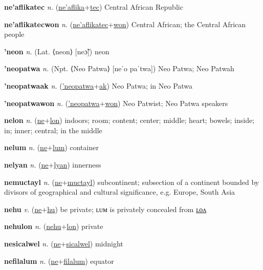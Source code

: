 \textbf{\hypertarget{ne'aflikatec}{ne'aflikatec}} \textit{n.} (\hyperlink{ne'aflika}{ne'aflika}+\allowbreak \hyperlink{tec}{tec})
Central African Republic

\textbf{\hypertarget{ne'aflikatecwon}{ne'aflikatecwon}} \textit{n.} (\hyperlink{ne'aflikatec}{ne'aflikatec}+\allowbreak \hyperlink{won}{won})
Central African; the Central African people

\textbf{\hypertarget{'neon}{'neon}} \textit{n.} (Lat. ⟨neon⟩ [neɔ̃])
neon

\textbf{\hypertarget{'neopatwa}{'neopatwa}} \textit{n.} (Npt. ⟨Neo Patwa⟩ [neˈo paˈtwa])
Neo Patwa; Neo Patwah

\textbf{\hypertarget{'neopatwaak}{'neopatwaak}} \textit{n.} (\hyperlink{'neopatwa}{'neopatwa}+\allowbreak \hyperlink{ak}{ak})
Neo Patwa; in Neo Patwa

\textbf{\hypertarget{'neopatwawon}{'neopatwawon}} \textit{n.} (\hyperlink{'neopatwa}{'neopatwa}+\allowbreak \hyperlink{won}{won})
Neo Patwist; Neo Patwa speakers

\textbf{\hypertarget{nelon}{nelon}} \textit{n.} (\hyperlink{ne}{ne}+\allowbreak \hyperlink{lon}{lon})
indoors; room; content; center; middle; heart; bowels; inside; in; inner; central; in the middle

\textbf{\hypertarget{nelum}{nelum}} \textit{n.} (\hyperlink{ne}{ne}+\allowbreak \hyperlink{lum}{lum})
container

\textbf{\hypertarget{nelyan}{nelyan}} \textit{n.} (\hyperlink{ne}{ne}+\allowbreak \hyperlink{lyan}{lyan})
innerness

\textbf{\hypertarget{nemuctayl}{nemuctayl}} \textit{n.} (\hyperlink{ne}{ne}+\allowbreak \hyperlink{muctayl}{muctayl})
subcontinent; subsection of a continent bounded by divisors of geographical and cultural significance, e.g. Europe, South Asia

\textbf{\hypertarget{nehu}{nehu}} \textit{v.} (\hyperlink{ne}{ne}+\allowbreak \hyperlink{hu}{hu})
be private; ʟᴜᴍ is privately concealed from \hyperlink{nehulon}{ʟᴏᴧ}

\textbf{\hypertarget{nehulon}{nehulon}} \textit{n.} (\hyperlink{nehu}{nehu}+\allowbreak \hyperlink{lon}{lon})
private

\textbf{\hypertarget{nesicalwel}{nesicalwel}} \textit{n.} (\hyperlink{ne}{ne}+\allowbreak \hyperlink{sicalwel}{sicalwel})
midnight

\textbf{\hypertarget{nefilalum}{nefilalum}} \textit{n.} (\hyperlink{ne}{ne}+\allowbreak \hyperlink{filalum}{filalum})
equator

